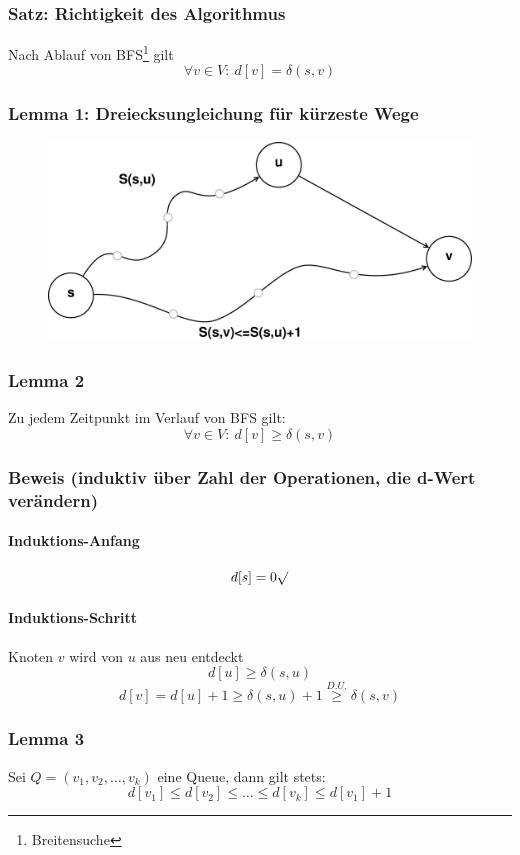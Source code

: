 \subsubsection{Satz: Richtigkeit des Algorithmus}
Nach Ablauf von BFS\footnote{Breitensuche} gilt 
\[ \forall v\in V: ~ d[v]=\delta(s,v) \]
\subsubsection{Lemma 1: Dreiecksungleichung für kürzeste Wege}
\begin{figure}[h]
\centering
\includegraphics[width=0.7\linewidth]{16/Grafik/Dreiecksungleichung}
\caption{}
\label{fig:Dreiecksungleichung}
\end{figure}

\subsubsection{Lemma 2}
Zu jedem Zeitpunkt im Verlauf von BFS gilt:
\[ \forall v\in V:~ d[v] \geq \delta(s,v)\]
\subsubsection{Beweis (induktiv über Zahl der Operationen, die d-Wert verändern)}
\paragraph{Induktions-Anfang} \[ d[s] = 0 \surd\]
\paragraph{Induktions-Schritt} Knoten $v$ wird von $u$ aus neu entdeckt
\[ d[u]\geq \delta(s,u) \]
\[ d[v] = d[u]+1 \geq \delta(s,u)+1 \overset{D.U.}{\geq} \delta(s,v) \]
\subsubsection{Lemma 3}
Sei $Q=(v_1,v_2,\ldots,v_k)$ eine Queue, dann gilt stets:
\[ d[v_1]\leq d[v_2]\leq\ldots\leq d[v_k]\leq d[v_1]+1 \]
